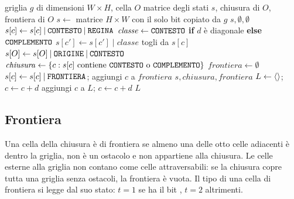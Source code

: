 \begin{algorithm}[H]
\caption{Calcolo di chiusura e frontiera di una cella $O$}
\label{alg:chiusura}
\begin{algorithmic}[1]
\Require griglia $g$ di dimensioni $W \times H$, cella $O$
\Ensure matrice degli stati $s$, chiusura di $O$, frontiera di $O$
  \State $s \gets$ matrice $H \times W$ con il solo bit  copiato da $g$
   \Return $s, \emptyset, \emptyset$ \EndIf
      \State $s[c] \gets s[c] \mathbin{|} \texttt{CONTESTO} \mathbin{|} \texttt{REGINA}$
      \State $\mathit{classe} \gets \texttt{CONTESTO}$ \textbf{if} $d$ è diagonale \textbf{else} $\texttt{COMPLEMENTO}$
          \State $s[c'] \gets s[c'] \mathbin{|} \mathit{classe}$
        \EndFor
      \EndFor
    \EndFor
  \EndFor
    \State togli  da $s[c]$ 
  \EndFor
  \State $s[O] \gets s[O] \mathbin{|} \texttt{ORIGINE} \mathbin{|} \texttt{CONTESTO}$
  \State $\mathit{chiusura} \gets \{c : s[c] \text{ contiene } \texttt{CONTESTO} \text{ o } \texttt{COMPLEMENTO}\}$
  \State $\mathit{frontiera} \gets \emptyset$
      \State $s[c] \gets s[c] \mathbin{|} \texttt{FRONTIERA}$; \quad aggiungi $c$ a $\mathit{frontiera}$
    \EndIf
  \EndFor
  \State \Return $s, \mathit{chiusura}, \mathit{frontiera}$
\EndProcedure
\Statex
{} 
  \State $L \gets \langle  \rangle$; \quad $c \gets c + d$
    \State aggiungi $c$ a $L$; \quad $c \gets c + d$
  \EndWhile
  \State \Return $L$
\EndFunction
\end{algorithmic}
\end{algorithm}

\subsection{Frontiera}

Una cella della chiusura è di frontiera se almeno una delle otto celle
adiacenti è dentro la griglia, non è un ostacolo e non appartiene alla
chiusura. Le celle esterne alla griglia non contano come celle
attraversabili: se la chiusura copre tutta una griglia senza ostacoli, la
frontiera è vuota. Il tipo di una cella di frontiera si legge dal suo stato:
$t=1$ se ha il bit , $t=2$ altrimenti.


